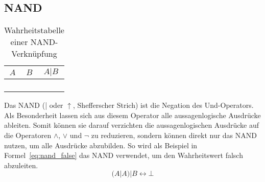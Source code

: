 \subsection{NAND}
%
\begin{table}[ht]
 \begin{center}
  \begin{tabular}{cc|c}
   \hline
    $A$ & $B$ & $A | B$ \\
   \hline \hline
    \F  & \F  & \T \\
    \F  & \T  & \T \\
    \T  & \F  & \T \\
    \T  & \T  & \F \\
  \end{tabular}
  \caption{Wahrheitstabelle einer NAND-Verknüpfung}
  \label{fig:nand_operator}
 \end{center}
\end{table}
%
Das NAND (| oder $\uparrow$, Shefferscher Strich) ist die Negation des Und-Operators. Als Besonderheit lassen sich aus diesem Operator alle aussagenlogische Ausdrücke ableiten. Somit können sie darauf verzichten die aussagenlogischen Ausdrücke auf die Operatoren $\land$, $\lor$ und $\neg$ zu reduzieren, sondern können direkt nur das NAND nutzen, um alle Ausdrücke abzubilden. So wird als Beispiel in Formel~\ref{eq:nand_false} das NAND verwendet, um den Wahrheitswert falsch abzuleiten.
\begin{equation}
 \label{eq:nand_false}
  (A | A) | B \leftrightarrow \bot
\end{equation}
%
